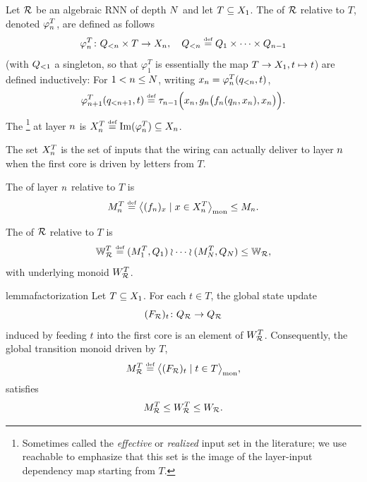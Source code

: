 \documentclass{article}
\begin{document}
\begin{definition}\label{def:dep-maps}
Let $\mathcal{R}$ be an algebraic RNN of depth $N$ and let $T \subseteq X_1$. 
The  of $\mathcal{R}$ relative to $T$, denoted 
$\varphi_n^T$, are defined as follows
$$
\varphi_n^T \colon Q_{<n} \times T \to X_n, \quad Q_{<n} \mathrel{\stackrel{\textnormal{\tiny def}}{=}} Q_1 \times \cdots \times Q_{n-1}
$$
(with $Q_{<1}$ a singleton, so that $\varphi_1^T$ is essentially the map $T \to X_1,  t \mapsto t$) are defined inductively:
For $1 < n \leq N$, writing $x_n = \varphi_n^T(q_{<n}, t)$,
\begin{align*}
\varphi_{n+1}^T(q_{<n+1}, t) \mathrel{\stackrel{\textnormal{\tiny def}}{=}} \tau_{n-1}\Bigl( x_n, g_n\bigl(f_n(q_n, x_n), x_n\bigr) \Bigr).
\end{align*}
The \footnote{Sometimes called the \emph{effective} or \emph{realized} input set in the literature; we use reachable to emphasize that this set is the image of the layer-input dependency map starting from $T$.} at layer $n$ is $X_n^T \mathrel{\stackrel{\textnormal{\tiny def}}{=}} \mathrm{Im}(\varphi_n^T) \subseteq X_n$.
\end{definition}

The set $X_n^T$ is the set of inputs that the wiring can actually deliver to layer $n$ when the first core is driven by letters from $T$.

\begin{definition}\label{def:realized-layer-monoid}
The  of layer $n$ relative to $T$ is
$$ 
M_n^T \mathrel{\stackrel{\textnormal{\tiny def}}{=}} \bigl\langle (f_n)_x \mid x \in X_n^T \bigr\rangle_{\mathrm{mon}} \leq M_n.
$$
\end{definition}

\begin{definition}\label{def:realized-wreath}
The  of $\mathcal{R}$ relative to $T$ is
$$
\mathbb{W}_{\mathcal{R}}^T \mathrel{\stackrel{\textnormal{\tiny def}}{=}} (M_1^T, Q_1) \wr \cdots \wr (M_N^T, Q_N) \le  \mathbb{W}_{\mathcal{R}},
$$
with underlying monoid $W_{\mathcal{R}}^T$.
\end{definition}

\begin{restatable}[Factorization]{lemma}{factorization}\label{lem:factorization}
Let $T \subseteq X_1$. For each $t \in T$, the global state update
$$
(F_{\mathcal{R}})_t \colon Q_{\mathcal{R}} \to Q_{\mathcal{R}}
$$
induced by feeding $t$ into the first core is an element of $W_{\mathcal{R}}^T$.
Consequently, the global transition monoid driven by $T$,
$$
M_{\mathcal{R}}^T \mathrel{\stackrel{\textnormal{\tiny def}}{=}} \bigl\langle (F_{\mathcal{R}})_t \mid t \in T \bigr\rangle_{\mathrm{mon}},
$$
satisfies
$$
M_{\mathcal{R}}^T \leq W_{\mathcal{R}}^T \leq W_{\mathcal{R}}.
$$
\end{restatable}
\end{document}
